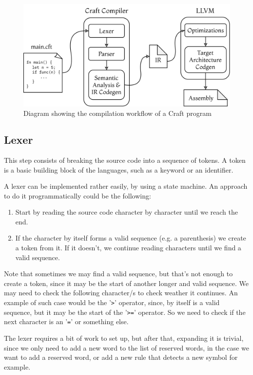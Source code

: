 ﻿\documentclass[10pt,a4paper,twocolumn,twoside]{article}
\begin{document}
\begin{figure}[ht]
\centering
\captionsetup{justification=centering,margin=1cm}
\includegraphics[width=\linewidth]{arch}
\caption{Diagram showing the compilation workflow of a Craft program}
\end{figure}

\subsection{Lexer} 
This step consists of breaking the source code into a sequence of tokens. A
token is a basic building block of the languages, such as a keyword or an
identifier.

A lexer can be implemented rather easily, by using a state machine. An approach
to do it programmatically could be the following:

\begin{enumerate}
    \item Start by reading the source code character by character until we reach
        the end.
    \item If the character by itself forms a valid sequence (e.g. a parenthesis)
        we create a token from it. If it doesn't, we continue reading characters
        until we find a valid sequence. 
\end{enumerate}

Note that sometimes we may find a valid sequence, but that's not enough to
create a token, since it may be the start of another longer and valid sequence.
We may need to check the following character/s to check weather it continues. An
example of such case would be the '\texttt{>}' operator, since, by itself is a
valid sequence, but it may be the start of the '\texttt{>=}' operator. So we
need to check if the next character is an '\texttt{=}' or something else.

The lexer requires a bit of work to set up, but after that, expanding it is 
trivial, since we only need to add a new word to the list of reserved words, in 
the case we want to add a reserved word, or add a new rule that detects a new 
symbol for example.
\end{document}
